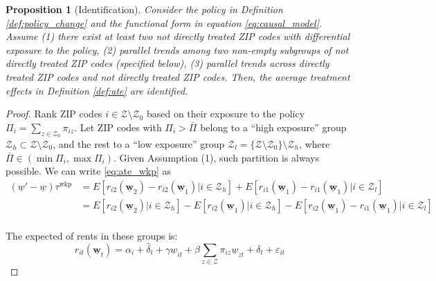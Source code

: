 \documentclass{article}
\newtheorem{prop}{Proposition}
\newcommand{\Z}{\mathcal{Z}}
\newcommand{\mw}{\underline{w}}
\newcommand{\wkp}{\text{wkp}}
\begin{document}
\begin{prop}[Identification]\label{prop:did_id}
    Consider the policy in Definition \ref{def:policy_change} and the functional
    form in equation \eqref{eq:causal_model}.
    Assume
    (1) there exist at least two not directly treated ZIP codes with differential 
    exposure to the policy, 
    (2) parallel trends among two non-empty subgroups of not directly treated 
    ZIP codes (specified below),
    (3) parallel trends across directly treated ZIP codes and not directly 
    treated ZIP codes.
    Then, the average treatment effects in Definition \ref{def:ate} are 
    identified.
\end{prop}

\begin{proof}
    Rank ZIP codes $i\in\Z\setminus\Z_0$ based on their exposure to the policy 
    $\Pi_i = \sum_{z\in\Z_0}\pi_{iz}$.
    Let ZIP codes with $\Pi_i > \bar\Pi$ belong to a ``high exposure'' group $\Z_h\subset\Z\setminus\Z_0$, 
    and the rest to a ``low exposure'' group $\Z_l=\{\Z\setminus\Z_0\}\setminus\Z_h$,
    where $\bar\Pi\in\left(\min{\Pi_i}, \max{\Pi_i}\right)$.
    Given Assumption (1), such partition is always possible.
    We can write \eqref{eq:ate_wkp} as
    \[
    \begin{split}
        (\mw'-\mw) \tau^{\wkp}
            & = E\left[r_{i2}(\mathbf{\mw}_2) - r_{i2}(\mathbf{\mw}_1) | i\in\Z_h \right]
              + E\left[r_{i1}(\mathbf{\mw}_1) - r_{i1}(\mathbf{\mw}_1) | i\in\Z_l\right] \\
              & = E\left[r_{i2}(\mathbf{\mw}_2) | i\in\Z_h \right] 
                 - E\left[r_{i2}(\mathbf{\mw}_1) | i\in\Z_h \right]
                - E\left[r_{i2}(\mathbf{\mw}_1) - r_{i1}(\mathbf{\mw}_1) | i\in\Z_l\right] \\
    \end{split}
    \]

    The expected of rents in these groups is:
    \[
        r_{it}(\mathbf{\mw}_{t})
           = \alpha_i + \hat\delta_t + \gamma \mw_{it}
           + \beta \sum_{z\in\Z} \pi_{iz} \mw_{zt}
           + \delta_t + \varepsilon_{it}
    \]
    

\end{proof}
\end{document}

